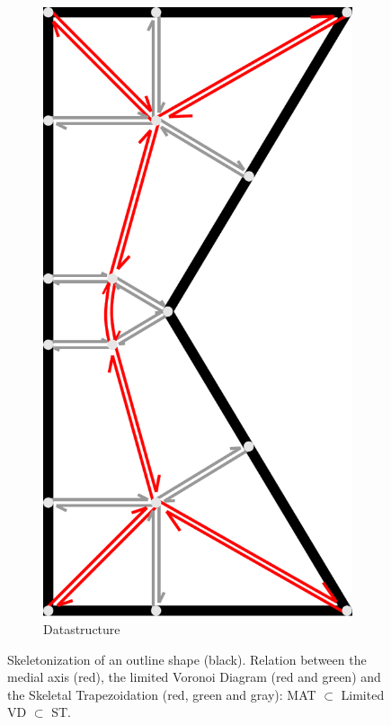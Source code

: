 \begin{figure}
\begin{subfigure}{\figwidth}
\includegraphics[width=\figwidthTwo]{sources/method/half_edge_datastructure.pdf}
\caption{Datastructure}\label{shape_decomposition_datastructure}
\end{subfigure}
\caption{
Skeletonization of an outline shape (black).
Relation between the medial axis (red), the limited Voronoi Diagram (red and green) and the Skeletal Trapezoidation (red, green and gray): MAT $\subset$ Limited VD $\subset$ ST.
}
\label{skeletonization_comparison}
\end{figure}



